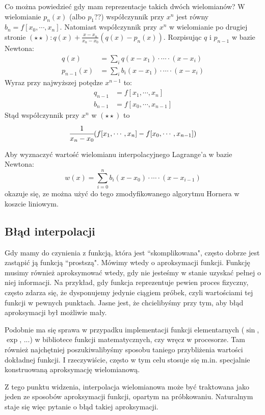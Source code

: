 \documentclass[hidelinks,a4paper,fleqn,oneside]{book}
\begin{document}
Co można powiedzieć gdy mam reprezentacje takich dwóch wielomianów? W wielomianie $p_n(x)$ (albo $p_1$??) współczynnik przy $x^n$ jest równy $b_n = f[x_0, \cdots, x_n]$. Natomiast współczynnik przy $x^n$ w wielomianie po drugiej stronie $(\star\star): q(x) + \frac{x-x_n}{x_n-x_0}(q(x) - p_n(x))$. Rozpisując $q$ i $p_{n-1}$ w bazie Newtona:
\begin{align*}
	q(x) &= \sum_{i} q(x-x_1)\cdot \cdots \cdot (x-x_i) \\
	p_{n-1}(x) &= \sum_{i} b_i(x-x_1)\cdot \cdots \cdot(x-x_i)
\end{align*}
Wyraz przy najwyższej potędze $x^{n-1}$ to:
\begin{align*}
	q_{n-1} &= f[x_1, \cdots, x_n] \\
	b_{n-1} &= f[x_0, \cdots, x_{n-1}]
\end{align*}
Stąd współczynnik przy $x^n$ w $(\star\star)$ to
\[
\cfrac{1}{x_n-x_0}(f[x_1, \cdots, x_n] - f[x_0, \cdots, x_{n-1}])
\]

Aby wyznaczyć wartość wielomianu interpolacyjnego Lagrange'a w bazie Newtona:
\[
	w(x) = \sum_{i=0}^{n} b_i(x-x_0)\cdot \cdots \cdot (x-x_{i-1})
\]
okazuje się, ze można użyć do tego zmodyfikowanego algorytmu Hornera w koszcie liniowym.

\subsection{Błąd interpolacji}

Gdy mamy do czynienia z funkcją, która jest ``skomplikowana", często dobrze jest zastąpić ją funkcją ``prostszą". Mówimy wtedy o aproksymacji funkcji. Funkcję musimy również aproksymować wtedy, gdy nie jesteśmy w stanie uzyskać pełnej o niej informacji. Na przykład, gdy funkcja reprezentuje pewien proces fizyczny, często zdarza się, że dysponujemy jedynie ciągiem próbek, czyli wartościami tej funkcji w pewnych punktach. Jasne jest, że chcielibyśmy przy tym, aby błąd aproksymacji był możliwie mały.

Podobnie ma się sprawa w przypadku implementacji funkcji elementarnych ($\sin$, $\exp$, ...) w bibliotece funkcji matematycznych, czy wręcz w procesorze. Tam również najchętniej poszukiwalibyśmy sposobu taniego przybliżenia wartości dokładnej funkcji. I rzeczywiście, często w tym celu stosuje się m.in. specjalnie konstruowaną aproksymację wielomianową.

Z tego punktu widzenia, interpolacja wielomianowa może być traktowana jako jeden ze sposobów aproksymacji funkcji, opartym na próbkowaniu. Naturalnym staje się więc pytanie o błąd takiej aproksymacji.
\end{document}
